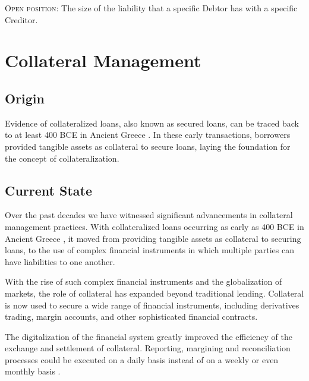 \documentclass[sigconf,nonacm]{acmart}
\begin{document}
\textsc{Open position:} The size of the liability that a specific Debtor has with a specific Creditor.

\section{Collateral Management}
\label{sec:collateral-management}

\subsection{Origin}
Evidence of collateralized loans, also known as secured loans, can be traced back to at least 400 BCE in Ancient Greece \cite{millett2002lending}.
In these early transactions, borrowers provided tangible assets as collateral to secure loans, laying the foundation for the concept of collateralization.

\subsection{Current State}
Over the past decades we have witnessed significant advancements in collateral management practices. With collateralized loans occurring as early as 400 BCE in Ancient Greece \cite{millett2002lending},
it moved from providing tangible assets as collateral to securing loans, to the use of complex financial instruments in which multiple parties can have liabilities to one another.

With the rise of such complex financial instruments and the globalization of markets, the role of collateral has expanded beyond traditional lending.
Collateral is now used to secure a wide range of financial instruments, including derivatives trading, margin accounts,
and other sophisticated financial contracts.

The digitalization of the financial system greatly improved the efficiency of the exchange and settlement of collateral.
Reporting, margining and reconciliation processes could be executed on a daily basis instead of on a weekly or even monthly basis \cite{simmons2019collateral}.
\end{document}
